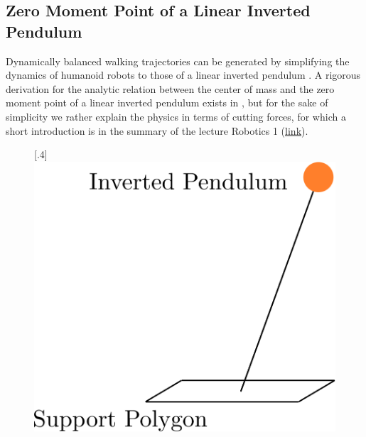 \subsection{Zero Moment Point of a Linear Inverted Pendulum}
Dynamically balanced walking trajectories can be generated by simplifying the dynamics of humanoid robots to those of a linear inverted pendulum \cite{kajita2003biped}. A rigorous derivation for the analytic relation between the center of mass and the zero moment point of a linear inverted pendulum exists in \cite{kajita2014introduction}, but for the sake of simplicity we rather explain the physics in terms of cutting forces, for which a short introduction is in the summary of the lecture Robotics 1 (\href{https://drive.google.com/file/d/1aN1ujXTOlHzO2kLPK7TQRkWfdY-pGzUF/view}{\underline{link}}). 
\begin{figure}[h!]
	\centering
	\subcaptionbox{}%
	[.4\linewidth]{\includegraphics[scale=.3]{chapters/02_foundations_for_humanoid_walking/img/inverted_pendulum.png}}
	\subcaptionbox{}%

\end{figure}

